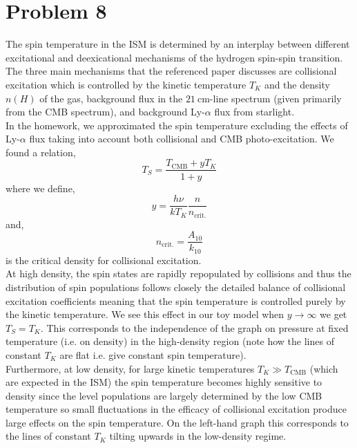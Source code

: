 \documentclass[12pt]{article}
\begin{document}
\section{Problem 8}

The spin temperature in the ISM is determined by an interplay between different excitational and deexicational mechanisms of the hydrogen spin-spin transition. The three main mechanisms that the referenced paper discusses are collisional excitation which is controlled by the kinetic temperature $T_K$ and the density $n(H)$ of the gas, background flux in the $21 \: \mathrm{cm}$-line spectrum (given primarily from the CMB spectrum), and background Ly-$\alpha$ flux from starlight.
\bigskip\\
In the homework, we approximated the spin temperature excluding the effects of Ly-$\alpha$ flux taking into account both collisional and CMB photo-excitation. We found a relation, 
\[ T_S = \frac{T_{\text{CMB}} + y T_K}{1 + y} \]  
where we define,
\[ y = \frac{h \nu}{k T_K} \frac{n}{n_{\text{crit.}}} \]
and,
\[ n_{\text{crit.}} = \frac{A_{10}}{k_{10}} \]
is the critical density for collisional excitation.
\bigskip\\
At high density, the spin states are rapidly repopulated by collisions and thus the distribution of spin populations follows closely the detailed balance of collisional excitation coefficients meaning that the spin temperature is controlled purely by the kinetic temperature. We see this effect in our toy model when $y \to \infty$ we get $T_S = T_K$. This corresponds to the independence of the graph on pressure at fixed temperature (i.e. on density) in the high-density region (note how the lines of constant $T_K$ are flat i.e. give constant spin temperature). 
\bigskip\\
Furthermore, at low density, for large kinetic temperatures $T_K \gg T_{\text{CMB}}$ (which are expected in the ISM) the spin temperature becomes highly sensitive to density since the level populations are largely determined by the low CMB temperature so small fluctuations in the efficacy of collisional excitation produce large effects on the spin temperature. On the left-hand graph this corresponds to the lines of constant $T_K$ tilting upwards in the low-density regime. 
\bigskip\\
\end{document}
